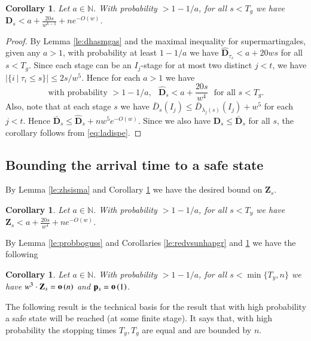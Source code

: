 \documentclass[11pt]{article}
\theoremstyle{plain}
\newtheorem{coro}[thm]{Corollary}
\numberwithin{equation}{subsection}
\newcommand{\Nat}{\mathbb{N}}
\newcommand{\smo}[1]{\mathop{\bf o}\/\left({#1}\right)}
\newcommand{\ZZ}{\mathbf{Z}}
\newcommand{\DD}{\mathbf{D}}
\newcommand{\pp}{\mathbf{p}}
\begin{document}
\begin{coro}\label{le:evenbouds}
Let $a\in\Nat$. With probability $>1-1/a$, for all $s<T_g$ we have
$\DD_{s}< a+ \frac{20s}{w^{k-1}} +n e^{-O(w)}$.
\end{coro}
\begin{proof}
By Lemma \ref{le:dhasmgas} and the maximal inequality for
supermartingales, given any $a>1$,
with probability at least $1-1/a$ we have 
$\hat{\DD}_{\tau_s}< a+ 20ws$ for all $s<T_g$.
Since each stage can be an $I_j$-stage for at most two distinct $j<t$, we have
$|\{i\ |\ \tau_i\leq s\}|\leq 2s/w^5$.
Hence for each $a>1$ we have
\begin{equation}\label{eq:ladispe}
\textrm{with probability $>1-1/a$,}\ \ \ \ 
\hat{\DD}_{s}< a+ \frac{20s}{w^{4}} \ \ \ \textrm{for all $s<T_g$.}
\end{equation}
Also, note that at each stage $s$ 
we have $\bar{D}_s(I_j)\leq \bar{D}_{\lambda_j(s)} (I_j)+w^5$ for each $j<t$. 
Hence $\bar{\DD}_s\leq \hat{\DD}_s +nw^5 e^{-O(w)}$. Since we also have
$\DD_s\leq\bar{\DD}_s$ for all $s$,
the corollary follows from \eqref{eq:ladispe}.
\end{proof}




\subsection{Bounding the arrival time to a safe state}
By Lemma \ref{le:zhsisma} and
Corollary \ref{le:evenbouds} we have the desired bound on $\ZZ_s$.

\begin{coro}\label{coro:boundzhf}
Let $a\in\Nat$. With probability $>1-1/a$, for all $s<T_y$ we have
$\ZZ_{s}< a+ \frac{20s}{w^{4}} +n e^{-O(w)}$.
\end{coro}

By Lemma \ref{le:probboguss} and Corollaries 
\ref{le:redvsunhapgr} and
\ref{coro:boundzhf} we have the following

\begin{coro}\label{coro:boundzadditif}
Let $a\in\Nat$. With probability $>1-1/a$, for all $s<\min\{T_y,n\}$ we have
$w^3 \cdot \ZZ_{s}=\smo{n}$ and $\pp_s=\smo{1}$.
\end{coro}


The following result is the technical basis for the result
 that with high probability a safe state will be reached
(at some finite stage). It says that, with high probability
the stopping times $T_y, T_g$ are equal and
 are bounded by $n$. 
 
\end{document}
